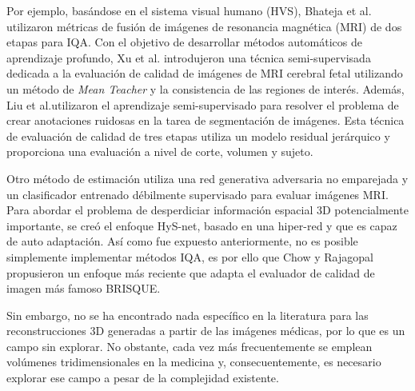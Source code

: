 Por ejemplo, basándose en el sistema visual humano (HVS), 
Bhateja et al.\cite{MultiModalMRIFusionMethod} utilizaron métricas de fusión
de imágenes de resonancia magnética (MRI) de dos etapas para IQA.
Con el objetivo de desarrollar métodos automáticos de aprendizaje profundo,
Xu et al.\cite{SemiSupervisedMRIFetalBrain} introdujeron una técnica semi-supervisada dedicada a la evaluación de 
calidad de imágenes de MRI cerebral fetal utilizando un método de 
\emph{Mean Teacher}\cite{MeanTeacher} y la consistencia de las regiones de interés. 
Además, Liu et al.\cite{IQAForPediatricMRIWithNoisySegmentation}utilizaron el aprendizaje semi-supervisado para resolver 
el problema de crear anotaciones ruidosas en la tarea de segmentación de imágenes. 
Esta técnica de evaluación de calidad de tres etapas utiliza un modelo residual 
jerárquico y proporciona una evaluación a nivel de corte, volumen y sujeto. 

Otro método de estimación utiliza una red generativa adversaria no emparejada 
y un clasificador entrenado débilmente supervisado para evaluar imágenes MRI\cite{MIGAN}.
Para abordar el problema de desperdiciar información espacial 3D potencialmente importante, 
se creó el enfoque HyS-net\cite{Hys-net}, basado en una hiper-red y que es capaz de 
auto adaptación. Así como fue expuesto anteriormente, no es posible 
simplemente implementar métodos IQA, es por ello que Chow y Rajagopal \cite{MedicalBRISQUE} 
propusieron un enfoque más reciente que adapta el evaluador de calidad de imagen más famoso BRISQUE\cite{BRISQUE}.

Sin embargo, no se ha encontrado nada específico en la literatura para las 
reconstrucciones 3D generadas a partir de las imágenes médicas, por lo que es un campo sin explorar. 
No obstante, cada vez más frecuentemente se emplean 
volúmenes tridimensionales en la medicina y, consecuentemente, es necesario explorar ese 
campo a pesar de la complejidad existente.
